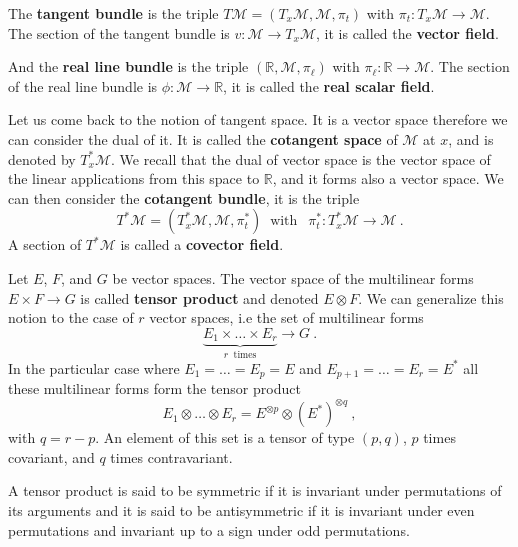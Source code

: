 \documentclass[11pt]{book}
\newcommand{\Mcal}{\mathcal{M}}
\newcommand{\Rbb}{\mathbb{R}}
\theoremstyle{break}
\begin{document}


The \textbf{tangent bundle} is the triple $T\Mcal=(T_x\Mcal, \Mcal, \pi_t)$ with $\pi_t : T_x\Mcal \to \Mcal$. The section of the tangent bundle is $v : \Mcal \to T_x\Mcal$, it is called the \textbf{vector field}. 




And the \textbf{real line bundle} is the triple $(\Rbb, \Mcal, \pi_\ell)$ with $\pi_\ell : \Rbb \to \Mcal$. The section of the real line bundle is $\phi : \Mcal \to \Rbb$, it is called the \textbf{real scalar field}. 




Let us come back to the notion of tangent space. It is a vector space therefore we can consider the dual of it. It is called the \textbf{cotangent space} of $\Mcal$ at $x$, and is denoted by $T^\ast_x\Mcal$. We recall that the dual of vector space is the vector space of the linear applications from this space to $\Rbb$, and it forms also a vector space. We can then consider the \textbf{cotangent bundle}, it is the triple
%
\begin{equation*}
T^\ast\Mcal=(T^\ast_x\Mcal, \Mcal, \pi^\ast_t) \ \mbox{ with } \ \ \pi^\ast_t : T^\ast_x\Mcal \to \Mcal \ .
\end{equation*}
%
A section of $T^\ast\Mcal$ is called a \textbf{covector field}.




Let $E$, $F$, and $G$ be vector spaces. The vector space of the multilinear forms $E \times F \to G$ is called \textbf{tensor product} and denoted $E \otimes F$. We can generalize this notion to the case of $r$ vector spaces, i.e the set of multilinear forms
%
\begin{equation*}
\underbrace{E_1 \times \dots \times E_r}_{r \ \mbox{ times}} \to G \ .
\end{equation*}
%
In the particular case where $E_1 = \dots = E_p = E$ and $E_{p+1} = \dots = E_r = E^\ast$ all these multilinear forms form the tensor product 
%
\begin{equation*}
E_1 \otimes \dots \otimes E_r = E^{\otimes p} \otimes (E^\ast)^{\otimes q} \ ,
\end{equation*}
%
with $q=r-p$. An element of this set is a tensor of type $(p,q)$, $p$ times covariant, and $q$ times contravariant. 


A tensor product is said to be symmetric if it is invariant under permutations of its arguments and it is said to be antisymmetric if it is invariant under even permutations and invariant up to a sign under odd permutations.
\end{document}
